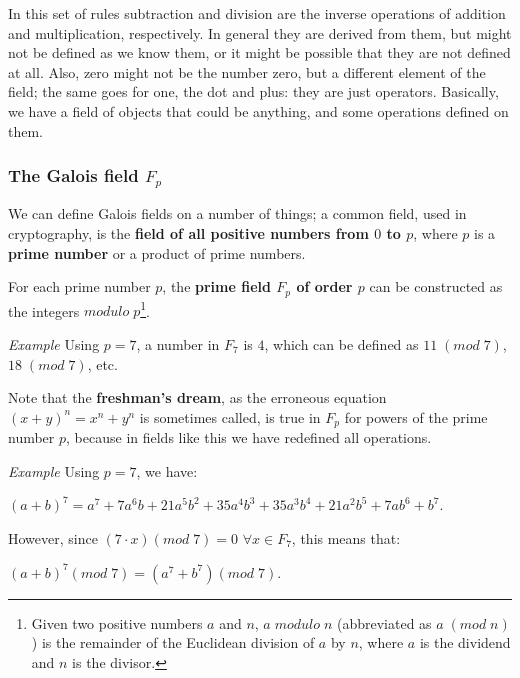 In this set of rules subtraction and division are the inverse operations of addition and multiplication, respectively. In general they are derived from them, but might not be defined as we know them, or it might be possible that they are not defined at all. Also, zero might not be the number zero, but a different element of the field; the same goes for one, the dot and plus: they are just operators. Basically, we have a field of objects that could be anything, and some operations defined on them.


\subsubsection{The Galois field $F_p$}
We can define Galois fields on a number of things; a common field, used in cryptography, is the \textbf{field of all positive numbers from $0$ to $p$}, where $p$ is a \textbf{prime number} or a product of prime numbers.

For each prime number $p$, the \textbf{prime field $F_p$ of order $p$} can be constructed as the integers $modulo\; p$\footnote{Given two positive numbers $a$ and $n$, $a\; modulo\; n$ (abbreviated as $a\; (mod\; n)$) is the remainder of the Euclidean division of $a$ by $n$, where $a$ is the dividend and $n$ is the divisor.}.

\vspace{0.5em}

\emph{Example} Using $p = 7$, a number in $F_7$ is $4$, which can be defined as $11\; (mod\; 7)$, $18\; (mod\; 7)$, etc.

Note that the \textbf{freshman's dream}, as the erroneous equation $(x+y)^n = x^n + y^n$ is sometimes called, is true in $F_p$ for powers of the prime number $p$, because in fields like this we have redefined all operations.

\vspace{0.5em}

\emph{Example} Using $p = 7$, we have:
\begin{center}
$(a + b)^7 = a^7 + 7a^6b + 21a^5b^2 + 35a^4b^3 + 35a^3b^4 + 21a^2b^5 + 7ab^6 + b^7$.
\end{center}

However, since $(7 \cdot x) (mod\; 7) = 0$ \; $\forall x \in F_7$, this means that:
\begin{center}
$(a + b)^7 (mod\; 7) = (a^7 + b^7) (mod\; 7)$.
\end{center}

